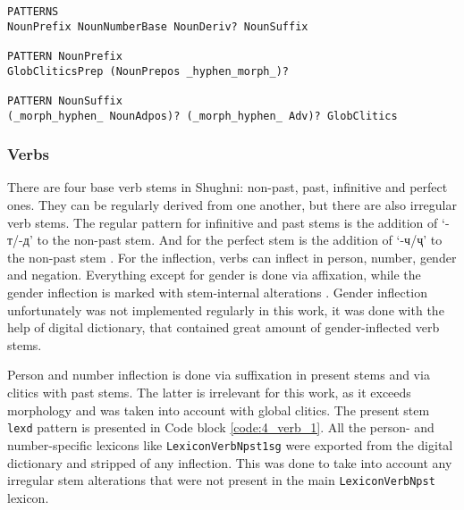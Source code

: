 \begin{code_frame}[float,floatplacement=!h]
    \begin{footnotesize}\codespacing
    \begin{verbatim}
PATTERNS
NounPrefix NounNumberBase NounDeriv? NounSuffix

PATTERN NounPrefix
GlobCliticsPrep (NounPrepos _hyphen_morph_)?

PATTERN NounSuffix
(_morph_hyphen_ NounAdpos)? (_morph_hyphen_ Adv)? GlobClitics
    \end{verbatim}
    \end{footnotesize}
    \tcblower
    \label{code:4_noun_2}
\end{code_frame}

\subsubsection*{Verbs} \label{lexd_verbs}
There are four base verb stems in Shughni: non-past, past, infinitive and perfect ones. They can be regularly derived from one another, but there are also irregular verb stems. The regular pattern for infinitive and past stems is the addition of `-т/-д' to the non-past stem. And for the perfect stem is the addition of `-ч/ҷ' to the non-past stem \parencite[257]{parker_shughni_2023}. For the inflection, verbs can inflect in person, number, gender and negation. Everything except for gender is done via affixation, while the gender inflection is marked with stem-internal alterations \parencite[261]{parker_shughni_2023}. Gender inflection unfortunately was not implemented regularly in this work, it was done with the help of digital dictionary, that contained great amount of gender-inflected verb stems.

Person and number inflection is done via suffixation in present stems and via clitics with past stems. The latter is irrelevant for this work, as it exceeds morphology and was taken into account with global clitics. The present stem \texttt{lexd} pattern is presented in Code block \ref{code:4_verb_1}. All the person- and number-specific lexicons like \texttt{LexiconVerbNpst1sg} were exported from the digital dictionary and stripped of any inflection. This was done to take into account any irregular stem alterations that were not present in the main \texttt{LexiconVerbNpst} lexicon.


